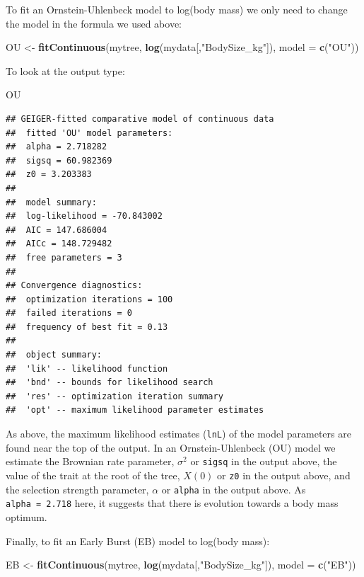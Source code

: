 \documentclass[]{book}
\newenvironment{Shaded}{\begin{snugshade}}{\end{snugshade}}
\newcommand{\KeywordTok}[1]{\textcolor[rgb]{0.13,0.29,0.53}{\textbf{{#1}}}}
\newcommand{\DataTypeTok}[1]{\textcolor[rgb]{0.13,0.29,0.53}{{#1}}}
\newcommand{\StringTok}[1]{\textcolor[rgb]{0.31,0.60,0.02}{{#1}}}
\newcommand{\NormalTok}[1]{{#1}}
\begin{document}
To fit an Ornstein-Uhlenbeck model to log(body mass) we only need to
change the model in the formula we used above:

\begin{Shaded}
\begin{Highlighting}[]
\NormalTok{OU <-}\StringTok{ }\KeywordTok{fitContinuous}\NormalTok{(mytree, }\KeywordTok{log}\NormalTok{(mydata[,}\StringTok{"BodySize_kg"}\NormalTok{]), }\DataTypeTok{model =} \KeywordTok{c}\NormalTok{(}\StringTok{"OU"}\NormalTok{))}
\end{Highlighting}
\end{Shaded}

To look at the output type:

\begin{Shaded}
\begin{Highlighting}[]
\NormalTok{OU}
\end{Highlighting}
\end{Shaded}

\begin{verbatim}
## GEIGER-fitted comparative model of continuous data
##  fitted 'OU' model parameters:
##  alpha = 2.718282
##  sigsq = 60.982369
##  z0 = 3.203383
## 
##  model summary:
##  log-likelihood = -70.843002
##  AIC = 147.686004
##  AICc = 148.729482
##  free parameters = 3
## 
## Convergence diagnostics:
##  optimization iterations = 100
##  failed iterations = 0
##  frequency of best fit = 0.13
## 
##  object summary:
##  'lik' -- likelihood function
##  'bnd' -- bounds for likelihood search
##  'res' -- optimization iteration summary
##  'opt' -- maximum likelihood parameter estimates
\end{verbatim}

As above, the maximum likelihood estimates (\texttt{lnL}) of the model
parameters are found near the top of the output. In an
Ornstein-Uhlenbeck (OU) model we estimate the Brownian rate parameter,
\(\sigma^2\) or \texttt{sigsq} in the output above, the value of the
trait at the root of the tree, \(X(0)\) or \texttt{z0} in the output
above, and the selection strength parameter, \(\alpha\) or
\texttt{alpha} in the output above. As \texttt{alpha\ =\ 2.718} here, it
suggests that there is evolution towards a body mass optimum.

Finally, to fit an Early Burst (EB) model to log(body mass):

\begin{Shaded}
\begin{Highlighting}[]
\NormalTok{EB <-}\StringTok{ }\KeywordTok{fitContinuous}\NormalTok{(mytree, }\KeywordTok{log}\NormalTok{(mydata[,}\StringTok{"BodySize_kg"}\NormalTok{]), }\DataTypeTok{model =} \KeywordTok{c}\NormalTok{(}\StringTok{"EB"}\NormalTok{))}
\end{Highlighting}
\end{Shaded}
\end{document}
